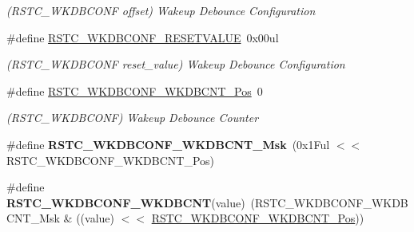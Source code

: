 \begin{DoxyCompactItemize}
\begin{DoxyCompactList}\small\item\em (R\+S\+T\+C\+\_\+\+W\+K\+D\+B\+C\+O\+N\+F offset) Wakeup Debounce Configuration \end{DoxyCompactList}\item 
\hypertarget{group___s_a_m_l21___r_s_t_c_ga1a5595517644291cc3057adbdc5a25f6}{}\#define \hyperlink{group___s_a_m_l21___r_s_t_c_ga1a5595517644291cc3057adbdc5a25f6}{R\+S\+T\+C\+\_\+\+W\+K\+D\+B\+C\+O\+N\+F\+\_\+\+R\+E\+S\+E\+T\+V\+A\+L\+U\+E}~0x00ul\label{group___s_a_m_l21___r_s_t_c_ga1a5595517644291cc3057adbdc5a25f6}

\begin{DoxyCompactList}\small\item\em (R\+S\+T\+C\+\_\+\+W\+K\+D\+B\+C\+O\+N\+F reset\+\_\+value) Wakeup Debounce Configuration \end{DoxyCompactList}\item 
\hypertarget{group___s_a_m_l21___r_s_t_c_ga04802a267786aed951e1e31ab54ce6ad}{}\#define \hyperlink{group___s_a_m_l21___r_s_t_c_ga04802a267786aed951e1e31ab54ce6ad}{R\+S\+T\+C\+\_\+\+W\+K\+D\+B\+C\+O\+N\+F\+\_\+\+W\+K\+D\+B\+C\+N\+T\+\_\+\+Pos}~0\label{group___s_a_m_l21___r_s_t_c_ga04802a267786aed951e1e31ab54ce6ad}

\begin{DoxyCompactList}\small\item\em (R\+S\+T\+C\+\_\+\+W\+K\+D\+B\+C\+O\+N\+F) Wakeup Debounce Counter \end{DoxyCompactList}\item 
\hypertarget{group___s_a_m_l21___r_s_t_c_ga4c8be54ad7c1695128d42056b50953d8}{}\#define {\bfseries R\+S\+T\+C\+\_\+\+W\+K\+D\+B\+C\+O\+N\+F\+\_\+\+W\+K\+D\+B\+C\+N\+T\+\_\+\+Msk}~(0x1\+Ful $<$$<$ R\+S\+T\+C\+\_\+\+W\+K\+D\+B\+C\+O\+N\+F\+\_\+\+W\+K\+D\+B\+C\+N\+T\+\_\+\+Pos)\label{group___s_a_m_l21___r_s_t_c_ga4c8be54ad7c1695128d42056b50953d8}

\item 
\hypertarget{group___s_a_m_l21___r_s_t_c_ga47dd13e98b48f21d75faa99fbd0634ad}{}\#define {\bfseries R\+S\+T\+C\+\_\+\+W\+K\+D\+B\+C\+O\+N\+F\+\_\+\+W\+K\+D\+B\+C\+N\+T}(value)~(R\+S\+T\+C\+\_\+\+W\+K\+D\+B\+C\+O\+N\+F\+\_\+\+W\+K\+D\+B\+C\+N\+T\+\_\+\+Msk \& ((value) $<$$<$ \hyperlink{group___s_a_m_l21___r_s_t_c_ga04802a267786aed951e1e31ab54ce6ad}{R\+S\+T\+C\+\_\+\+W\+K\+D\+B\+C\+O\+N\+F\+\_\+\+W\+K\+D\+B\+C\+N\+T\+\_\+\+Pos}))\label{group___s_a_m_l21___r_s_t_c_ga47dd13e98b48f21d75faa99fbd0634ad}


\end{DoxyCompactItemize}
